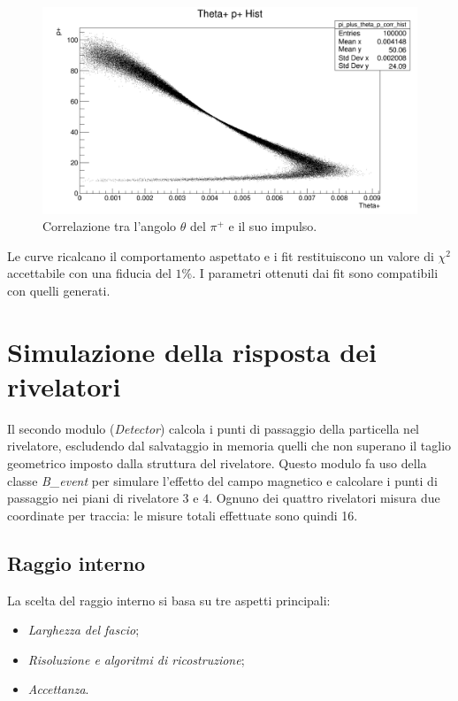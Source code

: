 \documentclass[8pt]{extarticle}
\begin{document}
\begin{figure}
	\begin{center}
		\includegraphics[scale=0.3]{gen_thetap} 
		\caption{Correlazione tra l'angolo $\theta$ del $\pi^+$ e il suo impulso.}
		\label{fig:gen_thetap}
	\end{center}
\end{figure}

Le curve ricalcano il comportamento aspettato e i fit restituiscono un valore di $\chi^2$ accettabile con una fiducia del $1\%$. I parametri ottenuti dai fit sono compatibili con quelli generati.

\section{Simulazione della risposta dei rivelatori} \label{sec:detector}
Il secondo modulo (\textit{Detector}) calcola i punti di passaggio della particella nel rivelatore, escludendo dal salvataggio in memoria quelli che non superano il taglio geometrico imposto dalla struttura del rivelatore. Questo modulo fa uso della classe \textit{B\_event} per simulare l'effetto del campo magnetico e calcolare i punti di passaggio nei piani di rivelatore $3$ e $4$. Ognuno dei quattro rivelatori misura due coordinate per traccia: le misure totali effettuate sono quindi 16.

\subsection{Raggio interno} \label{subsec:raggio_interno}
La scelta del raggio interno si basa su tre aspetti principali:
\begin{itemize}
\item \textit{Larghezza del fascio};
\item \textit{Risoluzione e algoritmi di ricostruzione};
\item \textit{Accettanza}.
\end{itemize}
\end{document}
